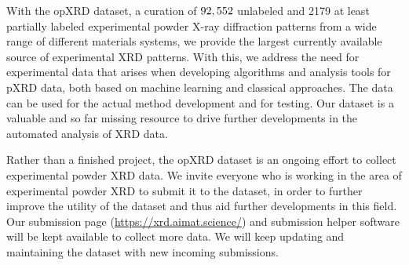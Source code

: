 With the opXRD dataset, a curation of $92,552$ unlabeled and 2179 at least partially labeled experimental powder X-ray diffraction patterns from a wide range of different materials systems, we provide the largest currently available source of experimental XRD patterns. With this, we address the need for experimental data that arises when developing algorithms and analysis tools for pXRD data, both based on machine learning and classical approaches. The data can be used for the actual method development and for testing. Our dataset is a valuable and so far missing resource to drive further developments in the automated analysis of XRD data.

Rather than a finished project, the opXRD dataset is an ongoing effort to collect experimental powder XRD data. We invite everyone who is working in the area of experimental powder XRD to submit it to the dataset, in order to further improve the utility of the dataset and thus aid further developments in this field. Our submission page (\url{https://xrd.aimat.science/}) and submission helper software will be kept available to collect more data. We will keep updating and maintaining the dataset with new incoming submissions.
